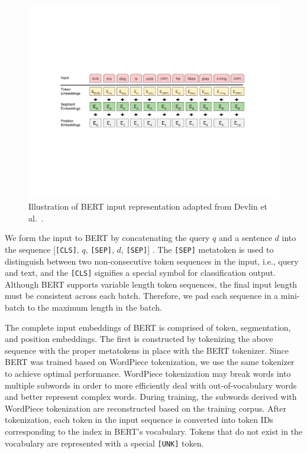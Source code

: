 
\begin{figure}[t!]
\centering
  \includegraphics[width=6.5in]{figures/input.pdf}
\caption{Illustration of BERT input representation adapted from Devlin et al.~\cite{devlin2018bert}.}
\label{fig:bert_input}
\end{figure}

We form the input to BERT by concatenating the query $ q $ and a sentence $ d $ into the sequence [\texttt{[CLS]}, $q$, \texttt{[SEP]}, $d$, \texttt{[SEP]}] .
The \texttt{[SEP]} metatoken is used to distinguish between two non-consecutive token sequences in the input, i.e., query and text, and the \texttt{[CLS]} signifies a special symbol for classification output.
Although BERT supports variable length token sequences, the final input length must be consistent across each batch.
Therefore, we pad each sequence in a mini-batch to the maximum length in the batch.

The complete input embeddings of BERT is comprised of token, segmentation, and position embeddings.
The first is constructed by tokenizing the above sequence with the proper metatokens in place with the BERT tokenizer.
Since BERT was trained based on WordPiece tokenization, we use the same tokenizer to achieve optimal performance.
WordPiece tokenization may break words into multiple subwords in order to more efficiently deal with out-of-vocabulary words and better represent complex words.
During training, the subwords derived with WordPiece tokenization are reconstructed based on the training corpus.
After tokenization, each token in the input sequence is converted into token IDs corresponding to the index in BERT's vocabulary.
Tokens that do not exist in the vocabulary are represented with a special \texttt{[UNK]} token.

